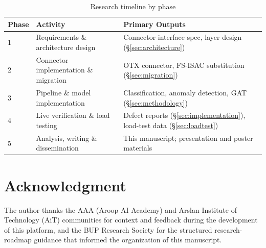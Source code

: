 \documentclass[conference]{IEEEtran}
\begin{document}
\begin{table}[h]
\caption{Research timeline by phase}
\label{tab:timeline}
\centering
\begin{tabular}{@{}p{0.6cm}p{3.0cm}p{4.0cm}@{}}
\toprule
\textbf{Phase} & \textbf{Activity} & \textbf{Primary Outputs} \\
\midrule
1 & Requirements \& architecture design & Connector interface spec, layer design (\S\ref{sec:architecture}) \\
2 & Connector implementation \& migration & OTX connector, FS-ISAC substitution (\S\ref{sec:migration}) \\
3 & Pipeline \& model implementation & Classification, anomaly detection, GAT (\S\ref{sec:methodology}) \\
4 & Live verification \& load testing & Defect reports (\S\ref{sec:implementation}), load-test data (\S\ref{sec:loadtest}) \\
5 & Analysis, writing \& dissemination & This manuscript; presentation and poster materials \\
\bottomrule
\end{tabular}
\end{table}

\section*{Acknowledgment}
The author thanks the AAA (Aroop AI Academy) and Arslan Institute of Technology (AiT) communities for context and feedback during the development of this platform, and the BUP Research Society for the structured research-roadmap guidance that informed the organization of this manuscript.
\end{document}
